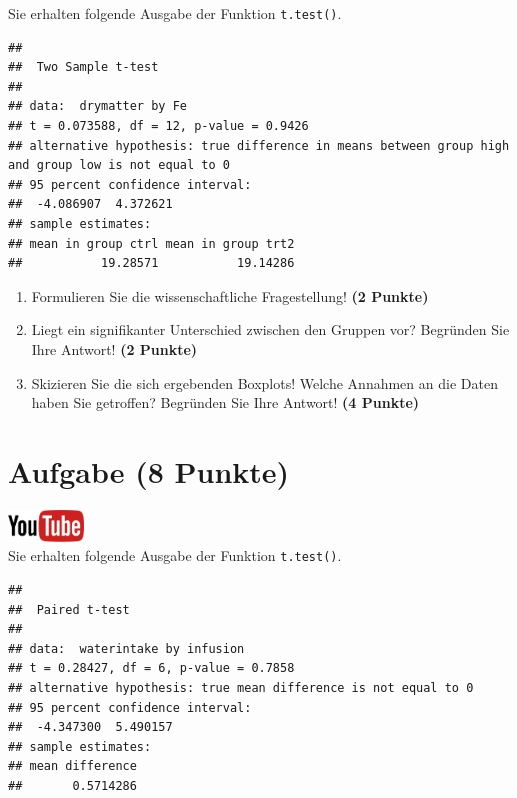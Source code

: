 \documentclass[a4paper, 10pt]{scrartcl}\usepackage[]{graphicx}\usepackage[]{xcolor}
\makeatletter
\newenvironment{kframe}{%
 \def\at@end@of@kframe{}%
 \ifinner\ifhmode%
  \def\at@end@of@kframe{\end{minipage}}%
  \begin{minipage}{\columnwidth}%
 \fi\fi%
 \def\FrameCommand##1{\hskip\@totalleftmargin \hskip-\fboxsep
 \colorbox{shadecolor}{##1}\hskip-\fboxsep
     \hskip-\linewidth \hskip-\@totalleftmargin \hskip\columnwidth}%
 \MakeFramed {\advance\hsize-\width
   \@totalleftmargin\z@ \linewidth\hsize
   \@setminipage}}%
 {\par\unskip\endMakeFramed%
 \at@end@of@kframe}
\newenvironment{knitrout}{}{} %
\makeatother
\begin{document}
Sie erhalten folgende \Rlogo Ausgabe der Funktion \texttt{t.test()}.

\begin{knitrout}
\color{fgcolor}\begin{kframe}
\begin{verbatim}
## 
## 	Two Sample t-test
## 
## data:  drymatter by Fe
## t = 0.073588, df = 12, p-value = 0.9426
## alternative hypothesis: true difference in means between group high and group low is not equal to 0
## 95 percent confidence interval:
##  -4.086907  4.372621
## sample estimates:
## mean in group ctrl mean in group trt2 
##           19.28571           19.14286
\end{verbatim}
\end{kframe}
\end{knitrout}


\begin{enumerate}
  \item Formulieren Sie die wissenschaftliche Fragestellung! \textbf{(2
Punkte)}
\item Liegt ein signifikanter Unterschied zwischen den Gruppen vor?
  Begr{\"u}nden Sie Ihre Antwort! \textbf{(2 Punkte)}
\item Skizieren Sie die sich ergebenden Boxplots! Welche Annahmen an die Daten haben Sie getroffen? Begr{\"u}nden Sie Ihre Antwort! \textbf{(4 Punkte)} 
\end{enumerate}
 
\clearpage

\section{Aufgabe \hfill (8 Punkte)}

\hfill\href{https://youtu.be/kHmfEmU6lrk}{\includegraphics[width =
  2cm]{img/youtube}}\\[1Ex]


Sie erhalten folgende \Rlogo Ausgabe der Funktion \texttt{t.test()}.

\begin{knitrout}
\color{fgcolor}\begin{kframe}
\begin{verbatim}
## 
## 	Paired t-test
## 
## data:  waterintake by infusion
## t = 0.28427, df = 6, p-value = 0.7858
## alternative hypothesis: true mean difference is not equal to 0
## 95 percent confidence interval:
##  -4.347300  5.490157
## sample estimates:
## mean difference 
##       0.5714286
\end{verbatim}
\end{kframe}
\end{knitrout}
\end{document}
